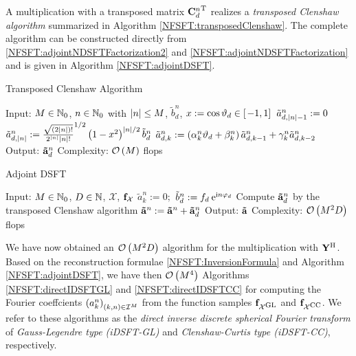 A multiplication with a transposed matrix ${\mathbf{C}^{n}_{d}}^{\text{\rm{T}}}$ realizes a 
\emph{transposed Clenshaw algorithm} summarized in Algorithm \ref{NFSFT:transposedClenshaw}. 
The complete algorithm can be constructed directly from \eqref{NFSFT:adjointNDSFTFactorization2} and 
\eqref{NFSFT:adjointNDSFTFactorization} and is given in Algorithm \ref{NFSFT:adjointDSFT}.
\begin{algorithm}[tb]
  \caption{Transposed Clenshaw Algorithm}
  \label{NFSFT:transposedClenshaw}    
  \begin{algorithmic}
    \STATE  Input: $M \in \mathbb{N}_{0}$, $n \in \mathbb{N}_{0}$ with $\left\vert n\right\vert \le M$, $\tilde{b}^n_{d}$, $x := \cos\vartheta_{d} \in \left[\left.-1,1\right]\right.$
    \STATE
    \STATE $\tilde{a}_{d,\left\vert n\right\vert-1}^n := 0$
    \STATE $\tilde{a}_{d,\left\vert n\right\vert}^n := \frac{\sqrt{(2|n|)!}}{2^{|n|} |n|!}^{1/2} \left(1-x^2\right)^{|n|/2} \tilde{b}^n_{d}$
      \STATE $\tilde{a}_{d,k}^n := \left(\alpha_{k}^n\vartheta_{d} + \beta_{k}^n\right)\tilde{a}_{d,k-1}^n + \gamma_{k}^n \tilde{a}_{d,k-2}^n$
    \ENDFOR
    \STATE
    \STATE Output: $\mathbf{\tilde{a}}^n_{d}$
    \STATE Complexity: $\mathcal{O}\left(M\right)$ flops
\end{algorithmic}
\end{algorithm}
\begin{algorithm}[tb]
  \caption{Adjoint DSFT}
  \label{NFSFT:adjointDSFT}    
  \begin{algorithmic}
    \STATE  Input: $M \in \mathbb{N}_{0}$, $D \in \mathbb{N}$, $\mathcal{X}$, $\mathbf{f}_{\mathcal{X}}$
    \STATE
        \STATE $\tilde{a}_{k}^n := 0;$
      \ENDFOR
    \ENDFOR
        \STATE $\tilde{b}^n_{d} := f_{d} \: \mbox{\rm{e}}^{\mbox{\scriptsize\rm{i}} n \varphi_{d}}$
        \STATE Compute $\mathbf{\tilde{a}}^n_{d}$ by the transposed Clenshaw algorithm
        \STATE $\mathbf{\tilde{a}}^n := \mathbf{\tilde{a}}^n + \mathbf{\tilde{a}}^n_{d}$
      \ENDFOR
    \ENDFOR
    \STATE
    \STATE Output: $\mathbf{\tilde{a}}$
    \STATE Complexity: $\mathcal{O}\left(M^2 D\right)$ flops
\end{algorithmic}
\end{algorithm}

We have now obtained an $\mathcal{O}\left(M^2 D\right)$ algorithm for the multiplication with $\mathbf{Y}^{\text{\rm{H}}}$. 
Based on the reconstruction formulae \eqref{NFSFT:InversionFormula} and Algorithm 
\ref{NFSFT:adjointDSFT}, we have then $\mathcal{O}\left(M^4\right)$ Algorithms \ref{NFSFT:directIDSFTGL} 
and \ref{NFSFT:directIDSFTCC} for computing the Fourier coeffcients $\left(a_{k}^n\right)_{(k,n) 
\in \mathcal{I}^M}$ from the function samples $\mathbf{f}_{\mathcal{X}^{\mbox{\scriptsize\rm{GL}}}}$ and 
$\mathbf{f}_{\mathcal{X}^{\mbox{\scriptsize\rm{CC}}}}$. We refer to these algorithms as the 
\emph{direct inverse discrete spherical Fourier transform} of 
\emph{Gauss-Legendre type (iDSFT-GL)} and \emph{Clenshaw-Curtis type (iDSFT-CC)}, respectively.

